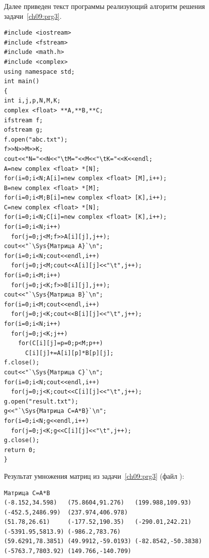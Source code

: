Далее приведен текст программы реализующий алгоритм решения задачи~\ref{ch09:prg3}. 
\begin{lstlisting}
#include <iostream>
#include <fstream>
#include <math.h>
#include <complex>
using namespace std;
int main()
{
int i,j,p,N,M,K;
complex <float> **A,**B,**C;
ifstream f;
ofstream g;
f.open("abc.txt");
f>>N>>M>>K;
cout<<"N="<<N<<"\tM="<<M<<"\tK="<<K<<endl;
A=new complex <float> *[N];
for(i=0;i<N;A[i]=new complex <float> [M],i++);
B=new complex <float> *[M];
for(i=0;i<M;B[i]=new complex <float> [K],i++);
C=new complex <float> *[N];
for(i=0;i<N;C[i]=new complex <float> [K],i++);
for(i=0;i<N;i++)
  for(j=0;j<M;f>>A[i][j],j++);
cout<<"`\Sys{Матрица A}`\n";
for(i=0;i<N;cout<<endl,i++)
  for(j=0;j<M;cout<<A[i][j]<<"\t",j++);
for(i=0;i<M;i++)
  for(j=0;j<K;f>>B[i][j],j++);
cout<<"`\Sys{Матрица B}`\n";
for(i=0;i<M;cout<<endl,i++)
  for(j=0;j<K;cout<<B[i][j]<<"\t",j++);
for(i=0;i<N;i++)
  for(j=0;j<K;j++)
    for(C[i][j]=p=0;p<M;p++)
      C[i][j]+=A[i][p]*B[p][j];
f.close();
cout<<"`\Sys{Матрица C}`\n";
for(i=0;i<N;cout<<endl,i++)
  for(j=0;j<K;cout<<C[i][j]<<"\t",j++);
g.open("result.txt");
g<<"`\Sys{Матрица C=A*B}`\n";
for(i=0;i<N;g<<endl,i++)
  for(j=0;j<K;g<<C[i][j]<<"\t",j++);
g.close();
return 0;
}
\end{lstlisting}

Результат умножения матриц из задачи~\ref{ch09:prg3} (файл ):

\begin{verbatim}
Матрица C=A*B
(-8.152,34.598)   (75.8604,91.276)   (199.988,109.93)    (-452.5,2486.99)  (237.974,406.978)
(51.78,26.61)     (-177.52,190.35)   (-290.01,242.21)    (-5391.95,5813.9) (-986.2,783.76)
(59.6291,78.3851) (49.9912,-59.0193) (-82.8542,-50.3838) (-5763.7,7803.92) (149.766,-140.709)
\end{verbatim}




